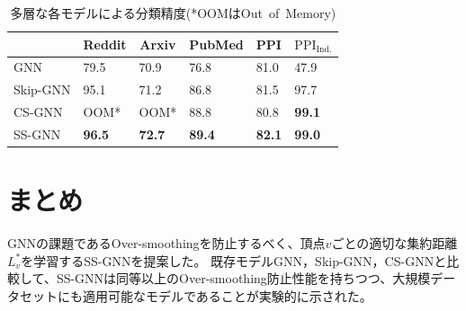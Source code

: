 \documentclass[a4j,twocolumn]{jsarticle}
\begin{document}
\vspace{-1mm}
\begin{table}[!h]
  \caption{多層な各モデルによる分類精度(*OOMはOut~of~Memory)}
  \label{table_experiment}
  \vspace{-1mm}
  \begin{tabular}{|l|l|l|l|l|l|}
  \hline
  \multicolumn{1}{|c|}{} & \multicolumn{1}{c|}{Reddit} & \multicolumn{1}{c|}{Arxiv} & PubMed        & PPI           & $\text{PPI}_{\text{Ind.}}$ \\ \hline
  GNN                    & 79.5                        & 70.9                       & 76.8          & 81.0          & 47.9                       \\ \hline
  Skip-GNN               & 95.1                        & 71.2                       & 86.8          & 81.5          & 97.7                       \\ \hline
  CS-GNN                 & OOM*                         & OOM*                        & 88.8          & 80.8          & \textbf{99.1}              \\ \hline
  SS-GNN                 & \textbf{96.5}               & \textbf{72.7}              & \textbf{89.4} & \textbf{82.1} & \textbf{99.0}              \\ \hline
  \end{tabular}
\end{table}


\section{まとめ}
\vspace{-2mm}
GNNの課題であるOver-smoothingを防止するべく、頂点$v$ごとの適切な集約距離$L_v^*$を学習するSS-GNNを提案した。
既存モデルGNN，Skip-GNN，CS-GNNと比較して、SS-GNNは同等以上のOver-smoothing防止性能を持ちつつ、大規模データセットにも適用可能なモデルであることが実験的に示された。


\end{document}
